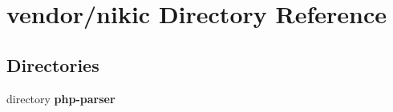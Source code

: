\section{vendor/nikic Directory Reference}
\label{dir_e5d04326205d969ff2c8ef9e50da78dd}
\subsection*{Directories}
\begin{DoxyCompactItemize}
\item 
directory {\bf php-\/parser}
\end{DoxyCompactItemize}
